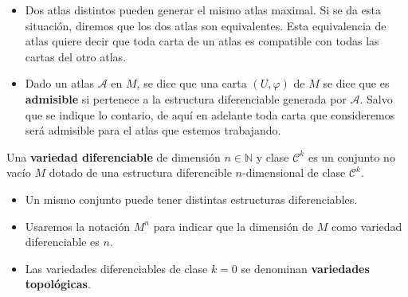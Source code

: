 \begin{obs} \:
\begin{itemize}
    \item Dos atlas distintos pueden generar el mismo atlas maximal. Si se da esta situación, diremos que los dos atlas son equivalentes. Esta equivalencia de atlas quiere decir que toda carta de un atlas es compatible con todas las cartas del otro atlas.
    \item Dado un atlas $\mathcal A$ en $M$, se dice que una carta $(U,\varphi)$ de $M$ se dice que es \textbf{admisible} si pertenece a la estructura diferenciable generada por $\mathcal A$. Salvo que se indique lo contario, de aquí en adelante toda carta que consideremos será admisible para el atlas que estemos trabajando.
\end{itemize}
\end{obs}
\begin{defi}
Una \textbf{variedad diferenciable} de dimensión $n\in \mathbb{N}$ y clase $\mathcal{C}^k$ es un conjunto no vacío $M$ dotado de una estructura diferencible $n$-dimensional de clase $\mathcal{C}^k$.
\end{defi}
\begin{obs} \:
\begin{itemize}
    \item Un mismo conjunto puede tener distintas estructuras diferenciables.
    \item Usaremos la notación $M^n$ para indicar que la dimensión de $M$ como variedad diferenciable es $n$.
    \item Las variedades diferenciables de clase $k=0$ se denominan \textbf{variedades topológicas}.
\end{itemize}
\end{obs}

